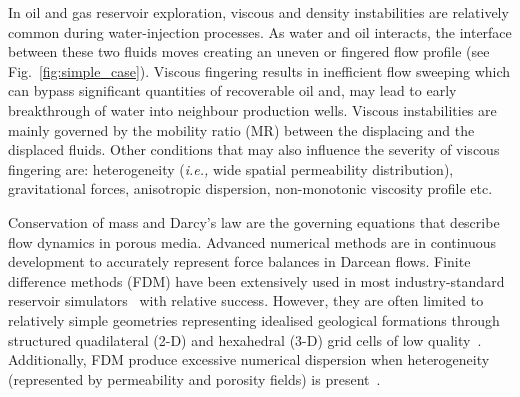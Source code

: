 \documentclass[preprint,authoryear,12pt]{elsarticle}
\newcommand{\ie}{{\it i.e., }}
\begin{document}
\medskip
In oil and gas reservoir exploration, viscous and density instabilities are relatively common during water-injection processes. As water and oil interacts, the interface between these two fluids moves creating an uneven or fingered flow profile (see Fig.~\ref{fig:simple_case}). Viscous fingering results in inefficient flow sweeping which can bypass significant quantities of recoverable oil and, may lead to early breakthrough of water into neighbour production wells. Viscous instabilities are mainly governed by the mobility ratio (MR) between the displacing and the displaced fluids. Other conditions that may also influence the severity of viscous fingering are: heterogeneity (\ie wide spatial permeability distribution), gravitational forces, anisotropic dispersion, non-monotonic viscosity profile etc.

\medskip 
Conservation of mass and Darcy's law are the governing equations that describe flow dynamics in porous media. Advanced numerical methods are in continuous development to accurately represent force balances in Darcean flows. Finite difference methods (FDM) have been extensively used in most industry-standard reservoir simulators~\citep{aziz_1986, chen_2005, chang_1990} with relative success. However, they are often limited to relatively simple geometries representing idealised geological formations through structured quadilateral (2-D) and hexahedral (3-D) grid cells of low quality~\citep{mlacnik_2004, king_1999}. Additionally, FDM produce excessive numerical dispersion when heterogeneity (represented by permeability and porosity fields) is present~\citep{chavent_1986}.
\end{document}
